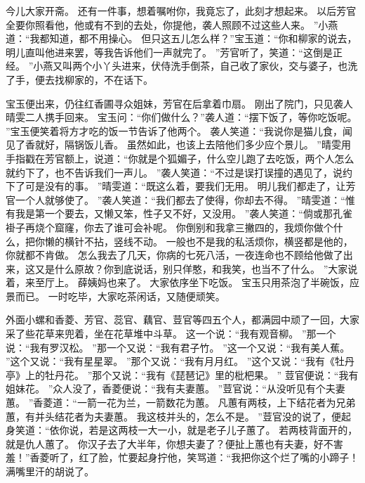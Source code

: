 今儿大家开斋。
还有一件事，想着嘱咐你，我竟忘了，此刻才想起来。
以后芳官全要你照看他，他或有不到的去处，你提他，袭人照顾不过这些人来。
”小燕道：“我都知道，都不用操心。
但只这五儿怎么样？”宝玉道：“你和柳家的说去，明儿直叫他进来罢，等我告诉他们一声就完了。
”芳官听了，笑道：“这倒是正经。
”小燕又叫两个小丫头进来，伏侍洗手倒茶，自己收了家伙，交与婆子，也洗了手，便去找柳家的，不在话下。
\par
宝玉便出来，仍往红香圃寻众姐妹，芳官在后拿着巾扇。
刚出了院门，只见袭人晴雯二人携手回来。
宝玉问：“你们做什么？”袭人道：“摆下饭了，等你吃饭呢。
”宝玉便笑着将方才吃的饭一节告诉了他两个。
袭人笑道：“我说你是猫儿食，闻见了香就好，隔锅饭儿香。
虽然如此，也该上去陪他们多少应个景儿。
”晴雯用手指戳在芳官额上，说道：“你就是个狐媚子，什么空儿跑了去吃饭，两个人怎么就约下了，也不告诉我们一声儿。
”袭人笑道：“不过是误打误撞的遇见了，说约下了可是没有的事。
”晴雯道：“既这么着，要我们无用。
明儿我们都走了，让芳官一个人就够使了。
”袭人笑道：“我们都去了使得，你却去不得。
”晴雯道：“惟有我是第一个要去，又懒又笨，性子又不好，又没用。
”袭人笑道：“倘或那孔雀褂子再烧个窟窿，你去了谁可会补呢。
你倒别和我拿三撇四的，我烦你做个什么，把你懒的横针不拈，竖线不动。
一般也不是我的私活烦你，横竖都是他的，你就都不肯做。
怎么我去了几天，你病的七死八活，一夜连命也不顾给他做了出来，这又是什么原故？你到底说话，别只佯憨，和我笑，也当不了什么。
”大家说着，来至厅上。
薛姨妈也来了。
大家依序坐下吃饭。
宝玉只用茶泡了半碗饭，应景而已。
一时吃毕，大家吃茶闲话，又随便顽笑。
\par
外面小螺和香菱、芳官、蕊官、藕官、荳官等四五个人，都满园中顽了一回，大家采了些花草来兜着，坐在花草堆中斗草。
这一个说：“我有观音柳。
”那一个说：“我有罗汉松。
”那一个又说：“我有君子竹。
”这一个又说：“我有美人蕉。
”这个又说：“我有星星翠。
”那个又说：“我有月月红。
”这个又说：“我有《牡丹亭》上的牡丹花。
”那个又说：“我有《琵琶记》里的枇杷果。
”
荳官便说：“我有姐妹花。
”众人没了，香菱便说：“我有夫妻蕙。
”荳官说：“从没听见有个夫妻蕙。
”香菱道：“一箭一花为兰，一箭数花为蕙。
凡蕙有两枝，上下结花者为兄弟蕙，有并头结花者为夫妻蕙。
我这枝并头的，怎么不是。
”荳官没的说了，便起身笑道：“依你说，若是这两枝一大一小，就是老子儿子蕙了。
若两枝背面开的，就是仇人蕙了。
你汉子去了大半年，你想夫妻了？便扯上蕙也有夫妻，好不害羞！”香菱听了，红了脸，忙要起身拧他，笑骂道：“我把你这个烂了嘴的小蹄子！满嘴里汗\bie 的胡说了。

